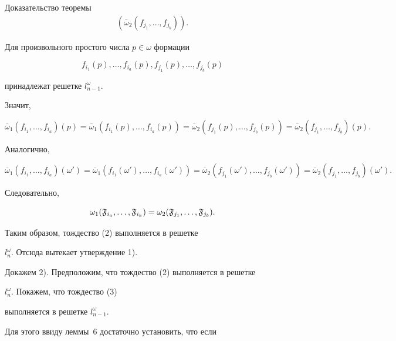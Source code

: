 \begin{pf*}{Доказательство теоремы}
\begin{align*}
(\overline{\omega}_2(f_{j_1},\dotsc,f_{j_b})).


\end{align*}


Для произвольного простого числа $p\in\omega$ формации


$$


f_{i_1}(p),\dotsc,f_{i_a}(p), f_{j_1}(p),\dotsc,f_{j_b}(p)


$$


принадлежат решетке $l_{n-1}^{\omega}$.


Значит,


$$


\overline{\omega}_1(f_{i_1},\dotsc,f_{i_a})(p)=


\overline{\omega}_1(f_{i_1}(p),\dotsc,f_{i_a}(p))=


\overline{\omega}_2(f_{j_1}(p),\dotsc,f_{j_b}(p))=


\overline{\omega}_2(f_{j_1},\dotsc,f_{j_b})(p).


$$


Аналогично,


$$


\overline{\omega}_1(f_{i_1},\dotsc,f_{i_a})(\omega')=


\overline{\omega}_1(f_{i_1}(\omega'),\dotsc,f_{i_a}(\omega'))=


\overline{\omega}_2(f_{j_1}(\omega'),\dotsc,f_{j_b}(\omega'))=


\overline{\omega}_2(f_{j_1},\dotsc,f_{j_b})(\omega').


$$


Следовательно,


$$


\omega_1(\frak{F}_{i_a},\dotsc,\frak{F}_{i_k})=


\omega_2(\frak{F}_{j_1},\dotsc,\frak{F}_{j_b}).


$$


Таким образом, тождество (2) выполняется в решетке


$l^{\omega}_n$. Отсюда вытекает утверждение 1).





Докажем 2). Предположим, что тождество (2) выполняется в решетке


$l^{\omega}_{n}$. Покажем, что тождество (3)


выполняется в решетке $l^{\omega}_{n-1}$.


Для этого ввиду леммы~6 достаточно установить, что если


$$



\end{pf*}
